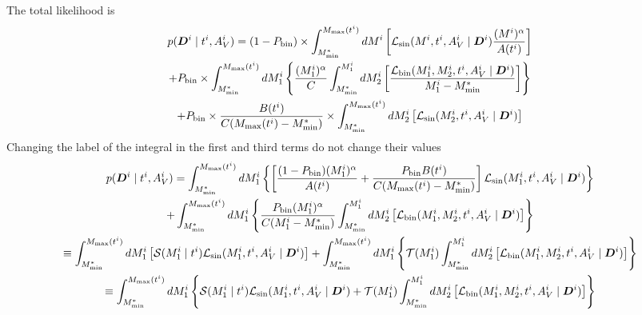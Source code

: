 \documentclass[a4paper,fleqn,usenatbib,onecolumn]{mnras}
\begin{document}
The total likelihood is
\begin{multline}
p(\bm{D}^i \mid t^i, A_V^i) = 
(1-P_{\rm bin}) \times \int_{M^\ast_{\rm min}}^{M_{\rm max}(t^i)} dM^i \left[ \mathcal{L}_{\rm sin}(M^i, t^i, A_V^i \mid \bm{D}^i) \dfrac{(M^i)^\alpha}{A(t^i)} \right] \\
+ P_{\rm bin} \times \int_{M^\ast_{\rm min}}^{M_{\rm max}(t^i)} dM_1^i \left\{ \dfrac{(M_1^i)^\alpha}{C} \int_{M^\ast_{\rm min}}^{M_1^i} dM_2^i\left[ \dfrac{\mathcal{L}_{\rm bin}(M_1^i, M_2^i, t^i, A_V^i \mid \bm{D}^i)}{M_1^i - M^\ast_{\rm min}} \right] \right\} \\
+ P_{\rm bin} \times \dfrac{B(t^i)}{C(M_{\rm max}(t^i) - M^\ast_{\rm min})} \times \int_{M^\ast_{\rm min}}^{M_{\rm max}(t^i)} dM_2^i\left[ \mathcal{L}_{\rm sin}(M_2^i, t^i, A_V^i \mid \bm{D}^i) \right]
\end{multline}
Changing the label of the integral in the first and third terms do not change their values
\begin{multline}
p(\bm{D}^i \mid t^i, A_V^i)
= \int_{M^\ast_{\rm min}}^{M_{\rm max}(t^i)} dM_1^i \left\{ \left[\dfrac{(1-P_{\rm bin})(M_1^i)^\alpha}{A(t^i)} + \dfrac{P_{\rm bin}B(t^i)}{C (M_{\rm max}(t^i) - M^\ast_{\rm min})} \right] \mathcal{L}_{\rm sin}(M_1^i, t^i, A_V^i \mid \bm{D}^i) \right\} \\
+ \int_{M^\ast_{\rm min}}^{M_{\rm max}(t^i)} dM_1^i \left\{ \dfrac{P_{\rm bin}(M_1^i)^\alpha}{C(M_1^i - M^\ast_{\rm min})} \int_{M^\ast_{\rm min}}^{M_1^i} dM_2^i \left[ \mathcal{L}_{\rm bin}(M_1^i, M_2^i, t^i, A_V^i \mid \bm{D}^i) \right] \right\} \\
\equiv \int_{M^\ast_{\rm min}}^{M_{\rm max}(t^i)} dM_1^i \left[ \mathcal{S}(M_1^i \mid t^i) \mathcal{L}_{\rm sin}(M_1^i, t^i, A_V^i \mid \bm{D}^i ) \right]
+ \int_{M^\ast_{\rm min}}^{M_{\rm max}(t^i)} dM_1^i \left\{ \mathcal{T}(M_1^i) \int_{M^\ast_{\rm min}}^{M_1^i} dM_2^i\left[ \mathcal{L}_{\rm bin}(M_1^i, M_2^i, t^i, A_V^i \mid \bm{D}^i) \right] \right\} \\
\equiv \int_{M^\ast_{\rm min}}^{M_{\rm max}(t^i)} dM_1^i \left\{ \mathcal{S}(M_1^i \mid t^i) \mathcal{L}_{\rm sin}(M_1^i, t^i, A_V^i \mid \bm{D}^i )
+ \mathcal{T}(M_1^i) \int_{M^\ast_{\rm min}}^{M_1^i} dM_2^i\left[ \mathcal{L}_{\rm bin}(M_1^i, M_2^i, t^i, A_V^i \mid \bm{D}^i) \right] \right\}
\end{multline}
\end{document}
